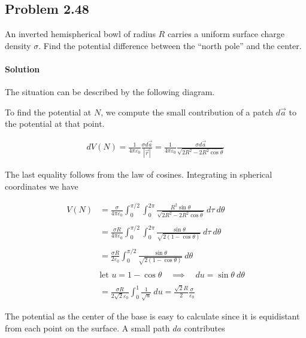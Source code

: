 \documentclass{article}
\begin{document}
\newpage


\subsection*{Problem 2.48}
 An inverted hemispherical bowl of radius $R$ carries a uniform surface
 charge density $\sigma$. Find the potential difference between the “north pole” and the center.

 \paragraph{Solution} The situation can be described by the following diagram. 

 

To find the potential at $N$, we compute the small contribution of a patch $d\vec{a}$ to the potential at that point. 

\begin{align*}
    dV(N) = \frac{1}{4\pi\varepsilon_0}\frac{\sigma d\vec{a}}{|\vec{r}|} = \frac{1}{4\pi\varepsilon_0}\frac{\sigma d\vec{a}}{\sqrt{2R^2 - 2R^2\cos{\theta}}}
\end{align*}

The last equality follows from the law of cosines. Integrating in spherical coordinates we have 

\begin{align*}
    V(N) &= \frac{\sigma}{4\pi\varepsilon_0}\int_0^{\pi/2}\int_0^{2\pi} \frac{R^2\sin\theta}{\sqrt{2R^2 - 2R^2\cos{\theta}}}\ d\tau\ d\theta \\
    \\
    &= \frac{\sigma R}{4\pi\varepsilon_0} \int_0^{\pi/2}\int_0^{2\pi}\frac{\sin\theta}{\sqrt{2(1 - \cos\theta)}}\ d\tau \ d\theta\\
    \\
    &= \frac{\sigma R}{2\varepsilon_0}\int_0^{\pi / 2} \frac{\sin\theta}{\sqrt{2(1 - \cos\theta)}}\ d \theta\\
    \\
    &\text{let } u = 1 - \cos\theta \quad \implies \quad du = \sin\theta\ d\theta \\
    \\
    &= \frac{\sigma R}{2\sqrt{2}\varepsilon_0}\int_0^{1} \frac{1}{\sqrt{u}}\ du = \frac{\sqrt{2}R}{2}\frac{\sigma}{\varepsilon_0}
\end{align*}

The potential as the center of the base is easy to calculate since it is equidistant from each point on the surface. A small path $da$ contributes 
\end{document}
